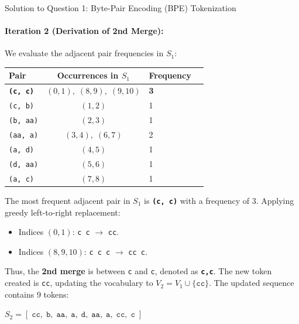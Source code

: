 \documentclass[11pt,a4paper]{article}
\begin{document}
\begin{solutionbox}{Solution to Question 1: Byte-Pair Encoding (BPE) Tokenization}
\paragraph{Iteration 2 (Derivation of 2nd Merge):}
We evaluate the adjacent pair frequencies in $S_1$:
\begin{center}
\begin{tabular}{lclc}
\toprule
\textbf{Pair} & \textbf{Occurrences in $S_1$} & \textbf{Frequency} \\
\midrule
\textbf{\texttt{(c, c)}} & $(0,1),\; (8,9),\; (9,10)$ & \textbf{3} \\
\texttt{(c, b)} & $(1,2)$ & 1 \\
\texttt{(b, aa)} & $(2,3)$ & 1 \\
\texttt{(aa, a)} & $(3,4),\; (6,7)$ & 2 \\
\texttt{(a, d)} & $(4,5)$ & 1 \\
\texttt{(d, aa)} & $(5,6)$ & 1 \\
\texttt{(a, c)} & $(7,8)$ & 1 \\
\bottomrule
\end{tabular}
\end{center}
The most frequent adjacent pair in $S_1$ is \textbf{\texttt{(c, c)}} with a frequency of 3.
Applying greedy left-to-right replacement:
\begin{itemize}[noitemsep]
    \item Indices $(0,1)$: \texttt{c c} $\to$ \texttt{cc}.
    \item Indices $(8,9,10)$: \texttt{c c c} $\to$ \texttt{cc c}.
\end{itemize}
Thus, the \textbf{2nd merge} is between \texttt{c} and \texttt{c}, denoted as \textbf{\texttt{c,c}}.
The new token created is \texttt{cc}, updating the vocabulary to $V_2 = V_1 \cup \{\texttt{cc}\}$.
The updated sequence contains 9 tokens:
\begin{center}
$S_2 = [\;\texttt{cc},\; \texttt{b},\; \texttt{aa},\; \texttt{a},\; \texttt{d},\; \texttt{aa},\; \texttt{a},\; \texttt{cc},\; \texttt{c}\;]$
\end{center}


\end{solutionbox}
\end{document}
